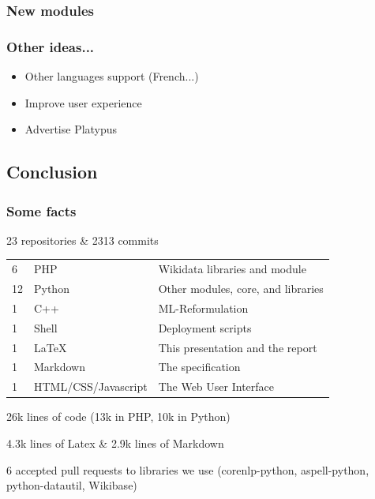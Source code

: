 \begin{frame}
    \frametitle{New modules}
\begin{figure}
\end{figure}
\end{frame}

\begin{frame}
    \frametitle{Other ideas...}

    \begin{itemize}
        \item Other languages support (French...)
        \item Improve user experience
        \item Advertise \alert{Platypus}
    \end{itemize}
\end{frame}

\subsection{Conclusion}

\begin{frame}
    \frametitle{Some facts} %
    \alert{23 repositories \& 2313 commits}

    \begin{tabular}{lll}
        6 & PHP & Wikidata libraries and module\\
        12 & Python & Other modules, core, and libraries\\
        1 & C++ & ML-Reformulation\\
        1 & Shell & Deployment scripts\\
        1 & \LaTeX & This presentation and the report\\
        1 & Markdown & The specification\\
        1 & HTML/CSS/Javascript & The Web User Interface\\
    \end{tabular}

    \alert{26k lines} of code (13k in PHP, 10k in Python)

    \alert{4.3k lines} of Latex \& \alert{2.9k lines} of Markdown

    \alert{6} accepted pull requests to libraries we use (corenlp-python, aspell-python, python-datautil, Wikibase)
\end{frame}

